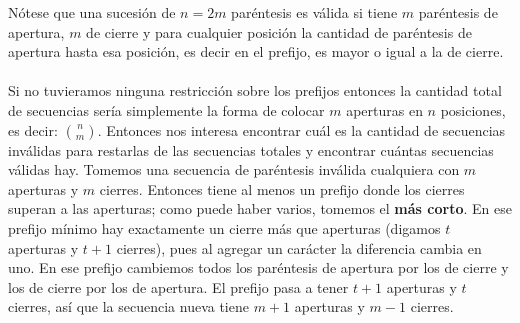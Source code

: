 \begin{center}
\end{center}
  Nótese que una sucesión de $n=2m$ paréntesis es válida si tiene $m$ paréntesis de apertura, $m$ de cierre y para cualquier posición la cantidad de paréntesis de apertura hasta esa posición, es decir en el prefijo, es mayor o igual a la de cierre.
  \\\\Si no tuvieramos ninguna restricción sobre los prefijos entonces la cantidad total de secuencias sería simplemente la forma de colocar $m$ aperturas en $n$ posiciones, es decir: $\binom{n}{m}$. Entonces nos interesa encontrar cuál es la cantidad de secuencias inválidas para restarlas de las secuencias totales y encontrar cuántas secuencias válidas hay. Tomemos una secuencia de paréntesis inválida cualquiera con $m$ aperturas y $m$ cierres. Entonces tiene al menos un prefijo donde los cierres superan a las aperturas; como puede haber varios, tomemos el \textbf{más corto}. En ese prefijo mínimo hay exactamente un cierre más que aperturas (digamos $t$ aperturas y $t+1$ cierres), pues al agregar un carácter la diferencia cambia en uno. En ese prefijo cambiemos todos los paréntesis de apertura por los de cierre y los de cierre por los de apertura. El prefijo pasa a tener $t+1$ aperturas y $t$ cierres, así que la secuencia nueva tiene $m+1$ aperturas y $m-1$ cierres.

